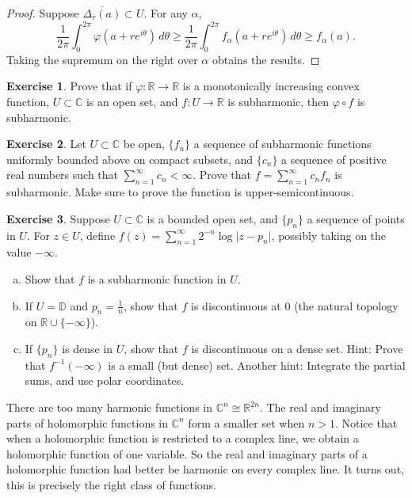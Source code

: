 \documentclass[12pt,openany]{book}
\newcommand{\sabs}[1]{\lvert {#1} \rvert}
\newcommand{\C}{{\mathbb{C}}}
\newcommand{\R}{{\mathbb{R}}}
\newcommand{\D}{{\mathbb{D}}}
\theoremstyle{plain}
\theoremstyle{remark}
\theoremstyle{definition}
\newenvironment{exbox}{%
    \def\FrameCommand{\vrule width 1pt \relax\hspace{10pt}}%
    \MakeFramed{\advance\hsize-\width\FrameRestore}%
}{%
    \endMakeFramed
}
\newenvironment{exparts}{%
    \leavevmode\begin{enumerate}[a),noitemsep,topsep=0pt,parsep=0pt,partopsep=0pt]
}{%
    \end{enumerate}
}
\theoremstyle{exercise}
\newtheorem{exercise}{Exercise}[section]
\theoremstyle{example}
\begin{document}
\begin{proof}
Suppose $\overline{\Delta_r(a)} \subset U$.  For any $\alpha$,
\begin{equation*}
\frac{1}{2\pi} \int_0^{2\pi} \varphi (a+re^{i\theta})\, d\theta 
\geq
\frac{1}{2\pi} \int_0^{2\pi} f_\alpha (a+re^{i\theta})\, d\theta 
\geq f_\alpha(a) .
\end{equation*}
Taking the supremum on the right over $\alpha$ obtains the results.
\end{proof}

\begin{exbox}
\begin{exercise}
Prove that if $\varphi \colon \R \to \R$ is a monotonically increasing
convex function, $U \subset \C$ is an open set, and $f \colon U \to \R$
is subharmonic, then $\varphi \circ f$ is subharmonic.
\end{exercise}

\begin{exercise}
Let $U \subset \C$ be open, $\{ f_n \}$ a sequence of 
subharmonic functions uniformly bounded above on compact subsets, and 
$\{ c_n \}$ a sequence of positive real numbers such that
$\sum_{n=1}^\infty c_n < \infty$.
Prove that $f = \sum_{n=1}^\infty c_n f_n$ is subharmonic.  Make sure to prove
the function is upper-semicontinuous.
\end{exercise}

\begin{exercise}
\pagebreak[2]%
Suppose $U \subset \C$ is a bounded open set, and $\{ p_n \}$ a sequence of points in
$U$. For $z \in U$, define
$f(z) = \sum_{n=1}^\infty 2^{-n} \log \sabs{z-p_n}$, possibly taking on the
value $-\infty$.
\begin{exparts}
\item
Show that $f$ is a subharmonic function in $U$.
\item
If $U = \D$ and $p_n = \frac{1}{n}$, show that $f$ is discontinuous at 0
(the natural topology on $\R \cup \{ -\infty \}$).
\item
If $\{ p_n \}$ is dense in $U$, show that $f$ 
is discontinuous on a dense set.
Hint: Prove that $f^{-1}(-\infty)$ is a small (but dense) set.
Another hint: Integrate the partial sums, and use polar coordinates.
\end{exparts}
\end{exercise}
\end{exbox}

\pagebreak[2]
There are too many harmonic functions in $\C^n \cong \R^{2n}$.
The real and imaginary parts of holomorphic functions in $\C^n$
form a smaller set when $n > 1$.  Notice that when a holomorphic
function is restricted to a complex line, we obtain a holomorphic
function of one variable.  So the real and imaginary parts
of a holomorphic function had better be harmonic on every complex line.
It turns out, this is precisely the right class of functions.
\end{document}
